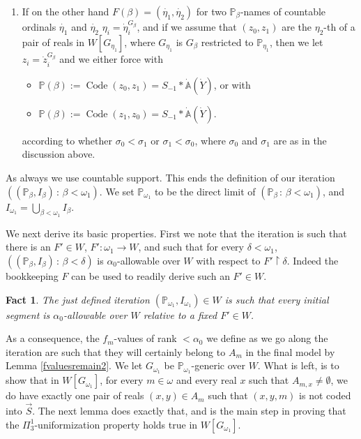 \documentclass[a4paper,11pt]{article}
\newtheorem{fact}[theorem]{Fact}
\newcommand{\forceP}{\mathbb{P}}
\begin{document}
\begin{enumerate}
\item[(3)] If on the other hand $F(\beta)= (\dot{\eta_1},\dot{\eta_2})$ for two $\forceP_{\beta}$-names of countable ordinals $\dot{\eta_1}$ and $\dot{\eta_2}$ $\eta_i=\dot{\eta}_i^{G_{\beta}}$, and if we assume that $(z_0,z_1)$ are the 
$\eta_2$-th of a pair of  reals in $W[G_{\eta_1}]$, where $G_{\eta_1}$ is $G_{\beta}$ restricted to $\forceP_{\eta_1}$, then we let $z_i = \dot{z}_i^{G_{\beta}}$ and we either force with 
 \begin{itemize}
 \item[] $\forceP(\beta):= \operatorname{Code} (z_0,z_1)= S_{-1} \ast \dot{\mathbb{A}} (\dot{Y} )$, or with 
 \item[] $\forceP(\beta):= \operatorname{Code} (z_1,z_0)= S_{-1} \ast \dot{\mathbb{A}} (\dot{Y} )$.
 \end{itemize}
 according to whether $\sigma_0 < \sigma_1$ or $\sigma_1 < \sigma_0$, where $\sigma_0$ and $\sigma_1$ are as in the discussion above.


 
\end{enumerate}
As always we use countable support. This ends the definition of our iteration $((\forceP_{\beta}, I_{\beta}) \, : \, \beta < \omega_1)$. We set $\forceP_{\omega_1}$ to be the direct limit of $(\forceP_{\beta} \, : \, \beta < \omega_1)$, and $I_{\omega_1}=\bigcup_{\beta < \omega_1} I_{\beta}$.
\par \medskip
We next derive its basic properties. First we note that the iteration is such that there is an $F' \in W$, $F': \omega_1 \rightarrow W$, and such that for every $\delta < \omega_1$,  $((\forceP_{\beta}, I_{\beta}) \, : \, \beta < \delta)$ is $\alpha_0$-allowable over $W$ with respect to $F' \upharpoonright \delta$. Indeed the bookkeeping $F$ can be used to readily derive such an $F' \in W.$

\begin{fact}
The just defined iteration $(\forceP_{\omega_1},I_{\omega_1}) \in W$ is such that every initial segment is $\alpha_0$-allowable over $W$ relative to a fixed $F' \in W$.
\end{fact}
As a consequence, the $f_m$-values of rank $< \alpha_0$ we define as we go along the iteration are such that they will certainly belong to $A_m$ in the final model by Lemma \ref{fvaluesremain2}. We let $G_{\omega_1}$ be $\forceP_{\omega_1}$-generic over $W$. What is left, is to show that in $W[G_{\omega_1}]$, for every $m \in \omega$ and every real $x$ such that $A_{m,x} \ne \emptyset$, we do have exactly one pair of reals $(x,y) \in A_m $ such that $(x,y,m)$ is not coded into $\vec{S}$.
The next lemma does exactly that, and is the main step in proving that the $\Pi^1_3$-uniformization property holds true in $W[G_{\omega_1}]$.
\end{document}
